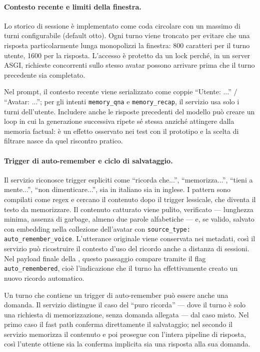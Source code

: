 \paragraph{Contesto recente e limiti della finestra.}

Lo storico di sessione è implementato come coda circolare con un massimo di turni configurabile (default otto). Ogni turno viene troncato per evitare che una risposta particolarmente lunga monopolizzi la finestra: 800 caratteri per il turno utente, 1600 per la risposta. L'accesso è protetto da un lock perché, in un server ASGI, richieste concorrenti sullo stesso avatar possono arrivare prima che il turno precedente sia completato.

Nel prompt, il contesto recente viene serializzato come coppie ``Utente: ...'' / ``Avatar: ...''; per gli intenti \texttt{memory\_qna} e \texttt{memory\_recap}, il servizio usa solo i turni dell'utente. Includere anche le risposte precedenti del modello può creare un loop in cui la generazione successiva ripete sé stessa anziché attingere dalla memoria factual: è un effetto osservato nei test con il prototipo e la scelta di filtrare nasce da quel riscontro pratico.

\paragraph{Trigger di auto-remember e ciclo di salvataggio.}

Il servizio riconosce trigger espliciti come ``ricorda che...'', ``memorizza...'', ``tieni a mente...'', ``non dimenticare...'', sia in italiano sia in inglese. I pattern sono compilati come regex e cercano il contenuto dopo il trigger lessicale, che diventa il testo da memorizzare. Il contenuto catturato viene pulito, verificato --- lunghezza minima, assenza di garbage, almeno due parole alfabetiche --- e, se valido, salvato con embedding nella collezione dell'avatar con \texttt{source\_type: auto\_remember\_voice}. L'utterance originale viene conservata nei metadati, così il servizio può ricostruire il contesto d'uso del ricordo anche a distanza di sessioni. Nel payload finale della , questo passaggio compare tramite il flag \texttt{auto\_remembered}, cioè l'indicazione che il turno ha effettivamente creato un nuovo ricordo automatico.

Un turno che contiene un trigger di auto-remember può essere anche una domanda. Il servizio distingue il caso del ``puro ricorda'' --- dove il turno è solo una richiesta di memorizzazione, senza domanda allegata --- dal caso misto. Nel primo caso il fast path conferma direttamente il salvataggio; nel secondo il servizio memorizza il contenuto e poi prosegue con l'intera pipeline di risposta, così l'utente ottiene sia la conferma implicita sia una risposta alla sua domanda.

